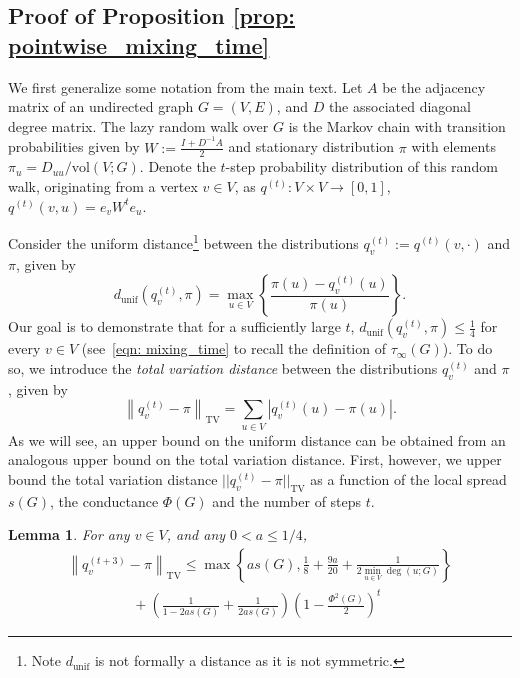 \documentclass[11pt,twoside]{article}
\newtheorem{lemma}{Lemma}
\newcommand{\set}[1]{\left\{#1\right\}}
\newcommand{\vol}{\mathrm{vol}}
\newcommand{\abs}[1]{\left \lvert #1 \right \rvert}
\newcommand{\norm}[1]{\left\lVert#1\right\rVert}
\newcommand{\1}{\mathbf{1}}
\newcommand{\Abf}{A}
\newcommand{\Wbf}{W}
\newcommand{\Dbf}{D}
\newcommand{\Ibf}[1]{I_{#1}}
\begin{document}
\subsection{Proof of Proposition \ref{prop: pointwise_mixing_time}}
\label{sec: pointwise_mixing_time}

We first generalize some notation from the main text. Let $A$ be the adjacency matrix of an undirected graph $G = (V,E)$, and $D$ the associated diagonal degree matrix. The lazy random walk over $G$ is the Markov chain with transition probabilities given by $\Wbf := \frac{\Ibf{} + \Dbf^{-1} \Abf}{2}$ and stationary distribution $\pi$ with elements $\pi_u = D_{uu}/\vol(V;G)$.  Denote the $t$-step probability distribution of this random walk, originating from a  vertex $v \in V$, as $q^{(t)}: V \times V \to [0,1]$, $q^{(t)}(v,u) = e_v \Wbf^t e_u$.

Consider the uniform distance\footnote{Note $d_{\textrm{unif}}$ is not formally a distance as it is not symmetric.} between the distributions $q_v^{(t)} := q^{(t)}(v,\cdot)$ and $\pi$, given by
\begin{equation*}
d_{\textrm{unif}}(q_v^{(t)},\pi) = \max_{u \in V} \set{\frac{\pi(u) - q_v^{(t)}(u)}{\pi(u)}}.
\end{equation*}
Our goal is to demonstrate that for a sufficiently large $t$, $d_{\textrm{unif}}(q_v^{(t)},\pi) \leq \frac{1}{4}$ for every $v \in V$ (see~\eqref{eqn: mixing_time} to recall the definition of $\tau_{\infty}(G)$). To do so, we introduce the \emph{total variation distance} between the distributions $q_v^{(t)}$ and $\pi$, given by
\begin{equation*}
\norm{q_v^{(t)} - \pi}_{\mathrm{TV}} = \sum_{u \in V} \abs{q_v^{(t)}(u) - \pi(u)}.
\end{equation*}
As we will see, an upper bound on the uniform distance can be obtained from an analogous upper bound on the total variation distance. First, however, we upper bound the total variation distance $||q_v^{(t)} - \pi||_{\mathrm{TV}}$ as a function of the local spread $s(G)$, the conductance $\Phi(G)$ and the number of steps $t$.
\begin{lemma}
	\label{lem: tv_mixing_time}
	For any $v \in V$, and any $0 < a \leq 1/4$,
	\begin{align}
	\norm{q_v^{(t + 3)} - \pi}_{\mathrm{TV}} \leq \max\set{as(G), \frac{1}{8} + \frac{9a}{20} + \frac{1}{2 \min_{u \in V} \deg(u;G)}} 
	\nonumber \\
	~~~~~~~~~~~~~~~~~~~~~ + \left(\frac{1}{1 - 2as(G)} +  \frac{1}{2 as(G)}\right) \left(1 - \frac{\Phi^2(G)}{2}\right)^t \label{eqn: tv_mixing_time}
	\end{align}
\end{lemma}
\end{document}
